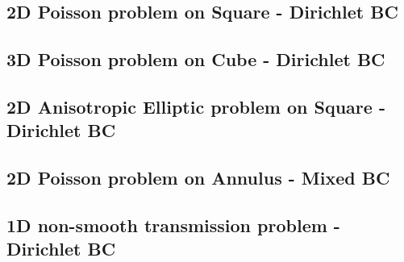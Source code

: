\subsection{2D Poisson problem on Square - Dirichlet BC}



\subsection{3D Poisson problem on Cube - Dirichlet BC}



\subsection{2D Anisotropic Elliptic problem on Square - Dirichlet BC}



\subsection{2D Poisson problem on Annulus - Mixed BC}



\subsection{1D non-smooth transmission problem - Dirichlet BC}


